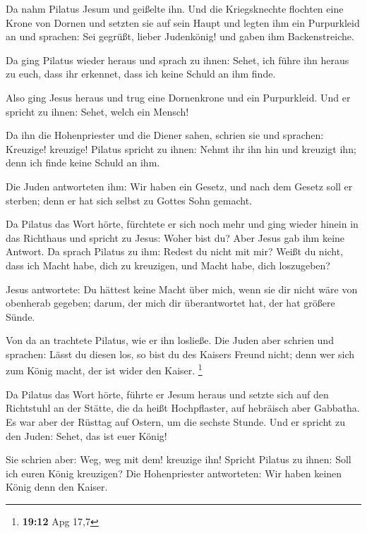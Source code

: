 Da nahm Pilatus Jesum und geißelte ihn. 
Und die Kriegsknechte flochten eine Krone von Dornen und setzten sie auf
sein Haupt und legten ihm ein Purpurkleid an  und
sprachen: Sei gegrüßt, lieber Judenkönig! und gaben ihm Backenstreiche.

 Da ging Pilatus wieder heraus und sprach zu ihnen: Sehet,
ich führe ihn heraus zu euch, dass ihr erkennet, dass ich keine Schuld
an ihm finde.

 Also ging Jesus heraus und trug eine Dornenkrone und ein
Purpurkleid. Und er spricht zu ihnen: Sehet, welch ein Mensch!

 Da ihn die Hohenpriester und die Diener sahen, schrien
sie und sprachen: Kreuzige! kreuzige! Pilatus spricht zu ihnen: Nehmt
ihr ihn hin und kreuzigt ihn; denn ich finde keine Schuld an ihm.

 Die Juden antworteten ihm: Wir haben ein Gesetz, und nach
dem Gesetz soll er sterben; denn er hat sich selbst zu Gottes Sohn
gemacht.

 Da Pilatus das Wort hörte, fürchtete er sich noch mehr
 und ging wieder hinein in das Richthaus und spricht zu
Jesus: Woher bist du? Aber Jesus gab ihm keine Antwort. 
Da sprach Pilatus zu ihm: Redest du nicht mit mir? Weißt du nicht, dass
ich Macht habe, dich zu kreuzigen, und Macht habe, dich loszugeben?

 Jesus antwortete: Du hättest keine Macht über mich, wenn
sie dir nicht wäre von obenherab gegeben; darum, der mich dir
überantwortet hat, der hat größere Sünde.

 Von da an trachtete Pilatus, wie er ihn losließe. Die
Juden aber schrien und sprachen: Lässt du diesen los, so bist du des
Kaisers Freund nicht; denn wer sich zum König macht, der ist wider den
Kaiser. \footnote{\textbf{19:12} Apg 17,7}

 Da Pilatus das Wort hörte, führte er Jesum heraus und
setzte sich auf den Richtstuhl an der Stätte, die da heißt Hochpflaster,
auf hebräisch aber Gabbatha.  Es war aber der Rüsttag auf
Ostern, um die sechste Stunde. Und er spricht zu den Juden: Sehet, das
ist euer König!

 Sie schrien aber: Weg, weg mit dem! kreuzige ihn!
Spricht Pilatus zu ihnen: Soll ich euren König kreuzigen? Die
Hohenpriester antworteten: Wir haben keinen König denn den Kaiser.

